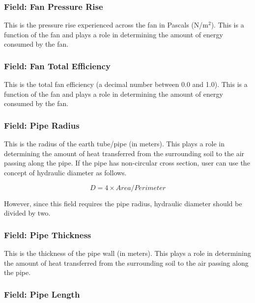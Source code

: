 \subsubsection{Field: Fan Pressure Rise}\label{field-fan-pressure-rise-1}

This is the pressure rise experienced across the fan in Pascals (N/m\(^{2}\)). This is a function of the fan and plays a role in determining the amount of energy consumed by the fan.

\subsubsection{Field: Fan Total Efficiency}\label{field-fan-total-efficiency-1}

This is the total fan efficiency (a decimal number between 0.0 and 1.0). This is a function of the fan and plays a role in determining the amount of energy consumed by the fan.

\subsubsection{Field: Pipe Radius}\label{field-pipe-radius}

This is the radius of the earth tube/pipe (in meters). This plays a role in determining the amount of heat transferred from the surrounding soil to the air passing along the pipe. If the pipe has non-circular cross section, user can use the concept of hydraulic diameter as follows.

\begin{equation}
D = 4 \times Area/Perimeter
\end{equation}

However, since this field requires the pipe radius, hydraulic diameter should be divided by two.

\subsubsection{Field: Pipe Thickness}\label{field-pipe-thickness}

This is the thickness of the pipe wall (in meters). This plays a role in determining the amount of heat transferred from the surrounding soil to the air passing along the pipe.

\subsubsection{Field: Pipe Length}\label{field-pipe-length}

